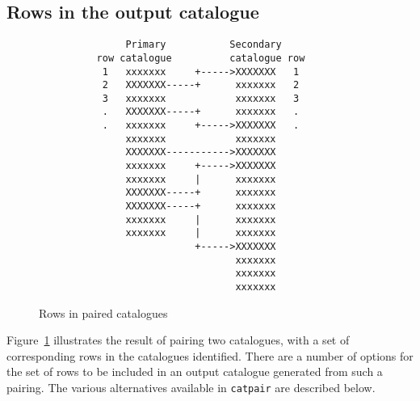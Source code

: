 \documentclass[twoside,11pt]{article}
\renewcommand{\_}{\texttt{\symbol{95}}}
\begin{document}
\subsection{\label{PAIR_PRTYP}Rows in the output catalogue}

\begin{figure}[htbp]

\begin{verbatim}
               Primary           Secondary
          row catalogue          catalogue row
           1   xxxxxxx     +----->XXXXXXX   1
           2   XXXXXXX-----+      xxxxxxx   2
           3   xxxxxxx            xxxxxxx   3
           .   XXXXXXX-----+      xxxxxxx   .
           .   xxxxxxx     +----->XXXXXXX   .
               xxxxxxx            xxxxxxx
               XXXXXXX----------->XXXXXXX
               xxxxxxx     +----->XXXXXXX
               xxxxxxx     |      xxxxxxx
               XXXXXXX-----+      xxxxxxx
               XXXXXXX-----+      xxxxxxx
               xxxxxxx     |      xxxxxxx
               xxxxxxx     |      xxxxxxx
                           +----->XXXXXXX
                                  xxxxxxx
                                  xxxxxxx
                                  xxxxxxx
\end{verbatim}

\caption{Rows in paired catalogues \label{PAIR_JOINED_CAT} }

\end{figure}

Figure~\ref{PAIR_JOINED_CAT} illustrates the result of pairing two catalogues,
with a set of corresponding rows in the catalogues identified. There are a
number of options for the set of rows to be included in an output catalogue
generated from such a pairing. The various alternatives available in
{\tt catpair} are described below.
\end{document}
